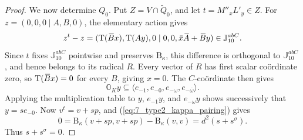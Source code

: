 \documentclass{amsart}
\def\ovA{\mathord{\mbox{\hspace*{0pt}}\,\overline{\!A\!\!\;}\!\:}\mbox{\hspace*{0pt}}}
\def\ovB{\mathord{\mbox{\hspace*{0pt}}\,\overline{\!B\!\!\;}\!\:}\mbox{\hspace*{0pt}}}
\def\ovx{\mathord{\mbox{\hspace*{0pt}}\,\overline{\!x\!\!\;}\!\:}\mbox{\hspace*{0pt}}}
\def\OO{\mathord{\mathbb{O}}}
\newcommand{\Tr}{\operatorname{T}}
\newcommand{\J}{\mathbb{J}}
\renewcommand{\bar}{\overline}
\newcommand{\B}{\mathrm{B}}
\newcommand{\s}{\sigma}
\theoremstyle{plain}
\numberwithin{theorem}{section}
\theoremstyle{definition}
\begin{document}
\begin{proof}
	We now determine $Q_0$.  Put $Z=V\cap\widetilde Q_0$, and let
	$t=M''_xL'_y\in Z$.  For $z=(0,0,0\mid A,B,0)$, the elementary action gives
	\begin{equation*}
		z^t-z=(\Tr(\ovB x),\Tr(Ay),0\mid0,0,
		\ovx\ovA+\ovB y)\in\J_{10}^{abC}.
	\end{equation*}
	Since $t$ fixes $\J_{10}^{abC}$ pointwise and preserves $\B_\kappa$,
	this difference is orthogonal to $\J_{10}^{abC}$, and hence belongs to
	its radical $R$.  Every vector of $R$ has first scalar co\"{o}rdinate zero,
	so $\Tr(\ovB x)=0$ for every $B$, giving $x=0$.  The $C$-co\"{o}rdinate
	then gives
	\begin{equation*}
		\OO_K y\subseteq
		\langle e_{-1},e_{-0},e_{-\omega},e_{-\bar\omega}\rangle.
	\end{equation*}
	Applying the multiplication table to $y$, $e_{-1}y$, and $e_{-\omega}y$
	shows successively that $y=s e_{-0}$.  Now $v^t=v+sp$, and
	(\ref{eq:7_type2_kappa_pairing}) gives
	\begin{equation*}
		0=\B_\kappa(v+sp,v+sp)-\B_\kappa(v,v)=d^2(s+s^{\s}).
	\end{equation*}
	Thus $s+s^{\s}=0$.


\end{proof}
\end{document}
